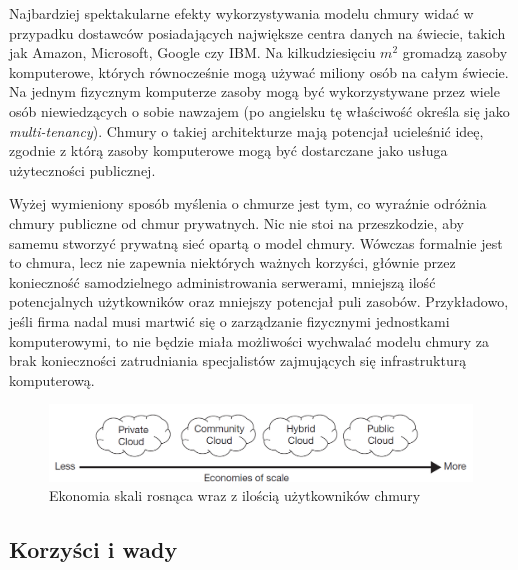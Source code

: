 \documentclass[12pt,a4paper,twoside,titlepage,openright]{book}
\begin{document}
Najbardziej spektakularne efekty wykorzystywania modelu chmury widać w przypadku dostawców posiadających największe centra danych na świecie, takich jak Amazon, Microsoft, Google czy IBM. Na kilkudziesięciu $m^{2}$ gromadzą zasoby komputerowe, których równocześnie mogą używać miliony osób na całym świecie. Na jednym fizycznym komputerze zasoby mogą być wykorzystywane przez wiele osób niewiedzących o sobie nawzajem (po angielsku tę właściwość określa się jako \textit{multi-tenancy}). Chmury o takiej architekturze mają potencjał ucieleśnić ideę, zgodnie z którą zasoby komputerowe mogą być dostarczane jako usługa użyteczności publicznej.

Wyżej wymieniony sposób myślenia o chmurze jest tym, co wyraźnie odróżnia chmury publiczne od chmur prywatnych. Nic nie stoi na przeszkodzie, aby samemu stworzyć prywatną sieć opartą o model chmury. Wówczas formalnie jest to chmura, lecz nie zapewnia niektórych ważnych korzyści, głównie przez konieczność samodzielnego administrowania serwerami, mniejszą ilość potencjalnych użytkowników oraz mniejszy potencjał puli zasobów. Przykładowo, jeśli firma nadal musi martwić się o zarządzanie fizycznymi jednostkami komputerowymi, to nie będzie miała możliwości wychwalać modelu chmury za brak konieczności zatrudniania specjalistów zajmujących się infrastrukturą komputerową.

\begin{figure}[h]
	\centering
			\includegraphics[width=\textwidth]{ekonomia-skali.png}
		\caption{Ekonomia skali rosnąca wraz z ilością użytkowników chmury \cite{ccCambridge}}
		\label{fig:ekonomia-skali}
\end{figure}

\subsection*{Korzyści i wady}
\end{document}
